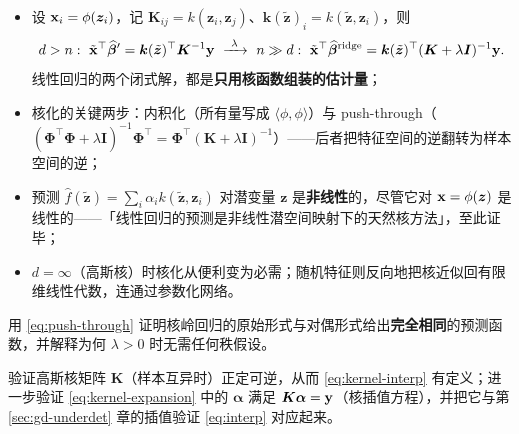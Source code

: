 \begin{keybox}[要点]
\begin{itemize}
  \item 设 $\mathbf{x}_i = \phi(\bm{z}_i)$，记 $\bm{K}_{ij} = k(\bm{z}_i,\bm{z}_j)$、$\bm{k}(\tilde{\bm{z}})_i = k(\tilde{\bm{z}}, \bm{z}_i)$，则
  \[
    d > n:\ \tilde{\x}^\top \widehat{\bbeta}' = \bm{k}(\tilde{\bm{z}})^\top \bm{K}^{-1} \y
    \ \xrightarrow{\ \lambda\ }\ 
    n \gg d:\ \tilde{\x}^\top \bhat^{\mathrm{ridge}} = \bm{k}(\tilde{\bm{z}})^\top (\bm{K} + \lambda \bm{I})^{-1} \y .
  \]
  线性回归的两个闭式解，都是\textbf{只用核函数组装的估计量}；
  \item 核化的关键两步：内积化（所有量写成 $\langle\phi,\phi\rangle$）与 push-through（$(\bm{\Phi}^\top\bm{\Phi} + \lambda\bm{I})^{-1}\bm{\Phi}^\top = \bm{\Phi}^\top(\bm{K} + \lambda\bm{I})^{-1}$）——后者把特征空间的逆翻转为样本空间的逆；
  \item 预测 $\hat{f}(\tilde{\bm{z}}) = \sum_i \alpha_i k(\tilde{\bm{z}}, \bm{z}_i)$ 对潜变量 $\bm{z}$ 是\textbf{非线性}的，尽管它对 $\mathbf{x} = \phi(\bm{z})$ 是线性的——「线性回归的预测是非线性潜空间映射下的天然核方法」，至此证毕；
  \item $d = \infty$（高斯核）时核化从便利变为必需；随机特征则反向地把核近似回有限维线性代数，连通过参数化网络。
\end{itemize}
\end{keybox}

\begin{exercise}\label{ex:kernel-dual}
用 \eqref{eq:push-through} 证明核岭回归的原始形式与对偶形式给出\textbf{完全相同}的预测函数，并解释为何 $\lambda > 0$ 时无需任何秩假设。
\end{exercise}

\begin{exercise}\label{ex:kernel-interp}
验证高斯核矩阵 $\bm{K}$（样本互异时）正定可逆，从而 \eqref{eq:kernel-interp} 有定义；进一步验证 \eqref{eq:kernel-expansion} 中的 $\bm{\alpha}$ 满足 $\bm{K}\bm{\alpha} = \mathbf{y}$（核插值方程），并把它与第 \ref{sec:gd-underdet} 章的插值验证 \eqref{eq:interp} 对应起来。
\end{exercise}
